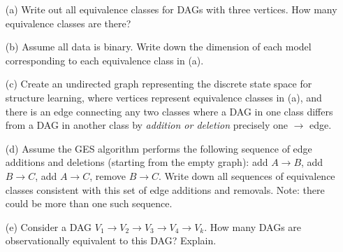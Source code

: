 \documentclass[11pt]{article}
\begin{document}
\begin{enumerate}
\item[(a)] Write out all equivalence classes for DAGs with three vertices.  How many equivalence classes are there?

\begin{answertext}{3cm}{}
    
\end{answertext}
\item[(b)] Assume all data is binary.  Write down the dimension of each model corresponding to each equivalence class in (a).

\begin{answertext}{3cm}{}
    
\end{answertext}
\item[(c)] Create an undirected graph representing the discrete state space for structure learning, where vertices represent equivalence classes in (a), and there is an edge connecting any two classes where a DAG in one class differs from a DAG in another class by \emph{addition or deletion} precisely one $\to$ edge.

\begin{answertext}{3cm}{}
    
\end{answertext}

\item[(d)] 
Assume the GES algorithm performs the following sequence of edge additions and deletions (starting from the empty graph): add $A\to B$, add $B \to C$, add $A \to C$, remove $B \to C$.
Write down all sequences of equivalence classes consistent with this set of edge additions and removals.  Note: there could be more than one such sequence.

\begin{answertext}{3cm}{}
    
\end{answertext}

\item[(e)] Consider a DAG $V_1 \to V_2 \to V_3 \to V_4 \to V_k$.  How many DAGs are observationally equivalent to this DAG?  Explain.

\begin{answertext}{3cm}{}
    
\end{answertext}

\end{enumerate}

\newpage %
\end{document}
